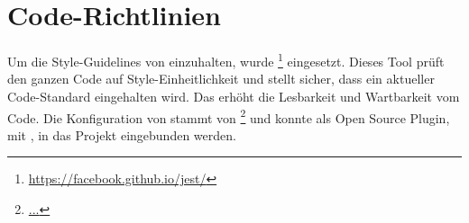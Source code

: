 \section{Code-Richtlinien}
\label{pd-entwicklungsumgebung-cr}

Um die Style-Guidelines von  einzuhalten, wurde \footnote{\url{https://facebook.github.io/jest/}} eingesetzt. 
Dieses Tool prüft den ganzen Code auf Style-Einheitlichkeit und stellt sicher, dass ein aktueller Code-Standard eingehalten wird. 
Das erhöht die Lesbarkeit und Wartbarkeit vom Code. 
Die Konfiguration von  stammt von \footnote{\url{...}} und konnte als Open Source Plugin, mit , in das Projekt eingebunden werden. 


